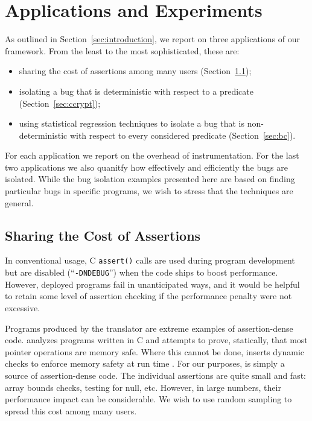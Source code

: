 \section{Applications and Experiments}
\label{sec:applications}

As outlined in Section~\ref{sec:introduction}, we report on three
applications of our framework.  From the least to the most sophisticated,
these are:
\begin{itemize}
\item sharing the cost of assertions among many users (Section~\ref{sec:ccured});

\item isolating a bug that is deterministic with respect to a predicate
(Section~\ref{sec:ccrypt});

\item using statistical regression techniques to isolate a bug that is non-deterministic with respect to every considered predicate (Section~\ref{sec:bc}).
\end{itemize}
For each application we report on the overhead of instrumentation.
For the last two applications we also quanitfy how effectively and efficiently
the bugs are isolated.  While the bug isolation examples presented here
are based on finding particular bugs in specific programs, we wish to stress
that the techniques are general.


\subsection{Sharing the Cost of Assertions}
\label{sec:ccured}

In conventional usage, C \texttt{assert()} calls are used during
program development but are disabled (``\texttt{-DNDEBUG}'') when the
code ships to boost performance.  However, deployed programs fail in
unanticipated ways, and it would be helpful to retain some level of
assertion checking if the performance penalty were not excessive.

Programs produced by the \CCured translator are extreme examples of
assertion-dense code.  \CCured analyzes programs written in C and
attempts to prove, statically, that most pointer operations are memory
safe.  Where this cannot be done, \CCured inserts dynamic checks to
enforce memory safety at run time \cite{POPL_'02*128}.  For our purposes, 
\CCured is simply a source of assertion-dense
code.  The individual assertions are quite small and fast: array
bounds checks, testing for null, etc.  However, in large numbers,
their performance impact can be considerable.  We wish to use random
sampling to spread this cost among many users.

